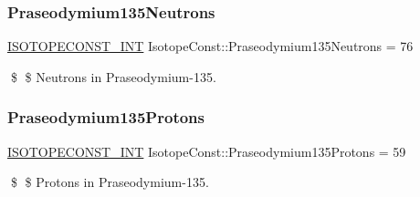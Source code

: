\subsubsection{\texorpdfstring{Praseodymium135\+Neutrons}{Praseodymium135Neutrons}}
{\footnotesize\ttfamily \mbox{\hyperlink{group___isotope_const-_macros_ga5f18360b3e99483a35c32d789e62621c}{I\+S\+O\+T\+O\+P\+E\+C\+O\+N\+S\+T\+\_\+\+I\+NT}} Isotope\+Const\+::\+Praseodymium135\+Neutrons = 76}

\$ \$ Neutrons in Praseodymium-\/135. \mbox{\label{group___isotope_const-_praseodymium-_pr135_ga4e9ce1210ad302dc5587a84ba2635544}} 
\subsubsection{\texorpdfstring{Praseodymium135\+Protons}{Praseodymium135Protons}}
{\footnotesize\ttfamily \mbox{\hyperlink{group___isotope_const-_macros_ga5f18360b3e99483a35c32d789e62621c}{I\+S\+O\+T\+O\+P\+E\+C\+O\+N\+S\+T\+\_\+\+I\+NT}} Isotope\+Const\+::\+Praseodymium135\+Protons = 59}

\$ \$ Protons in Praseodymium-\/135. 